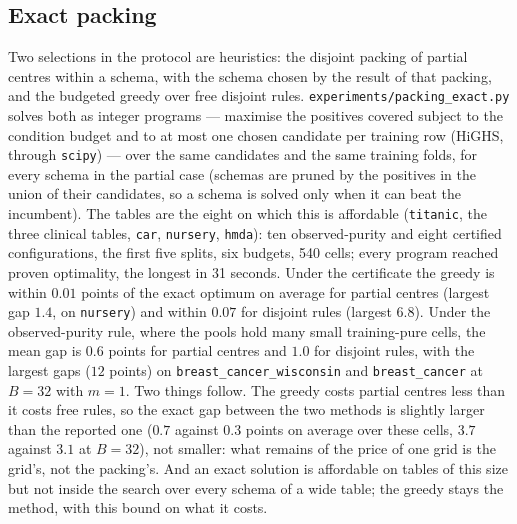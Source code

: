 \documentclass[11pt]{article}
\begin{document}
\begin{table}[t]\centering\small\setlength{\tabcolsep}{3.5pt}
\caption{The certified comparison on the same floors, $B=32$, each configuration at its own size floor $m$ (``own''); columns as in Table~\ref{tab:grid}. Generated by \texttt{experiments/paper\_tables.py} from \texttt{pairwise\_grid\_certified.csv}.}\label{tab:gridcert}

\end{table}

\subsection{Exact packing}\label{sec:packing}
Two selections in the protocol are heuristics: the disjoint packing of partial centres within a schema, with the schema chosen by the result of that packing, and the budgeted greedy over free disjoint rules. \texttt{experiments/packing\_exact.py} solves both as integer programs --- maximise the positives covered subject to the condition budget and to at most one chosen candidate per training row (HiGHS, through \texttt{scipy}) --- over the same candidates and the same training folds, for every schema in the partial case (schemas are pruned by the positives in the union of their candidates, so a schema is solved only when it can beat the incumbent). The tables are the eight on which this is affordable (\texttt{titanic}, the three clinical tables, \texttt{car}, \texttt{nursery}, \texttt{hmda}): ten observed-purity and eight certified configurations, the first five splits, six budgets, 540 cells; every program reached proven optimality, the longest in 31 seconds. Under the certificate the greedy is within $0.01$ points of the exact optimum on average for partial centres (largest gap $1.4$, on \texttt{nursery}) and within $0.07$ for disjoint rules (largest $6.8$). Under the observed-purity rule, where the pools hold many small training-pure cells, the mean gap is $0.6$ points for partial centres and $1.0$ for disjoint rules, with the largest gaps ($12$ points) on \texttt{breast\_cancer\_wisconsin} and \texttt{breast\_cancer} at $B=32$ with $m=1$. Two things follow. The greedy costs partial centres less than it costs free rules, so the exact gap between the two methods is slightly larger than the reported one ($0.7$ against $0.3$ points on average over these cells, $3.7$ against $3.1$ at $B=32$), not smaller: what remains of the price of one grid is the grid's, not the packing's. And an exact solution is affordable on tables of this size but not inside the search over every schema of a wide table; the greedy stays the method, with this bound on what it costs.
\end{document}
